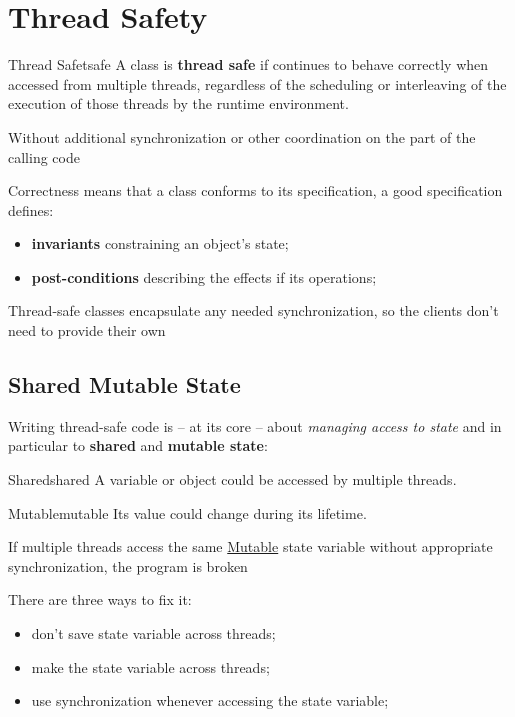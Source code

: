 \documentclass{article}
\begin{document}

\section{Thread Safety}\label{sec:ts_thread_safety} %
\begin{definition}{Thread Safe}{tsafe}
    A class is \textbf{thread safe} if continues to behave correctly when accessed from multiple threads, regardless of the scheduling or interleaving of the execution of those threads by the runtime environment.
    \begin{note}
        Without additional synchronization or other coordination on the part of the calling code
    \end{note}
\end{definition}
Correctness means that a class conforms to its specification, a good specification defines:
\begin{itemize}
    \item \textbf{invariants} constraining an object's state;
    \item \textbf{post-conditions} describing the effects if its operations;
\end{itemize}
\begin{note}
    Thread-safe classes encapsulate any needed synchronization, so the clients don't need to provide their own
\end{note}
%
\subsection{Shared Mutable State}\label{sub:ts_shared_mutable_state} %
Writing thread-safe code is -- at its core -- about \textit{managing access to state} and in particular to \textbf{shared} and \textbf{mutable state}:
\begin{definition}{Shared}{shared}
    A variable or object could be accessed by multiple threads.
\end{definition}
\begin{definition}{Mutable}{mutable}
    Its value could change during its lifetime.
\end{definition}
\begin{critical}
    If multiple threads access the same \hyperref[def:mutable]{Mutable} state variable without appropriate synchronization, the program is broken
\end{critical}
There are three ways to fix it:
\begin{itemize}
    \item don't save state variable across threads;
    \item make the state variable across threads;
    \item use synchronization whenever accessing the state variable;
\end{itemize}
%
\end{document}
